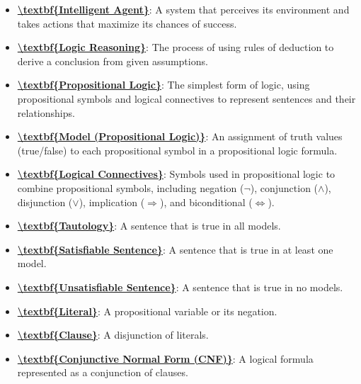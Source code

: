 \documentclass{article}%
\begin{document}
\begin{itemize}[leftmargin=*]%
\item \href{https://www.math.purdue.edu/~yipn/351/13L1-Logic.pdf#page=3}{\textbf{\textbackslash{}textbf\{Intelligent Agent\}}}: A system that perceives its environment and takes actions that maximize its chances of success.%
\item \href{https://www.math.purdue.edu/~yipn/351/13L1-Logic.pdf#page=7}{\textbf{\textbackslash{}textbf\{Logic Reasoning\}}}: The process of using rules of deduction to derive a conclusion from given assumptions.%
\item \href{https://www.math.purdue.edu/~yipn/351/13L1-Logic.pdf#page=8}{\textbf{\textbackslash{}textbf\{Propositional Logic\}}}: The simplest form of logic, using propositional symbols and logical connectives to represent sentences and their relationships.%
\item \href{https://www.math.purdue.edu/~yipn/351/13L1-Logic.pdf#page=9}{\textbf{\textbackslash{}textbf\{Model (Propositional Logic)\}}}: An assignment of truth values (true/false) to each propositional symbol in a propositional logic formula.%
\item \href{https://www.math.purdue.edu/~yipn/351/13L1-Logic.pdf#page=8}{\textbf{\textbackslash{}textbf\{Logical Connectives\}}}: Symbols used in propositional logic to combine propositional symbols, including negation ($\neg$), conjunction ($\wedge$), disjunction ($\vee$), implication ($\Rightarrow$), and biconditional ($\Leftrightarrow$).%
\item \href{https://www.math.purdue.edu/~yipn/351/13L1-Logic.pdf#page=13}{\textbf{\textbackslash{}textbf\{Tautology\}}}: A sentence that is true in all models.%
\item \href{https://www.math.purdue.edu/~yipn/351/13L1-Logic.pdf#page=13}{\textbf{\textbackslash{}textbf\{Satisfiable Sentence\}}}: A sentence that is true in at least one model.%
\item \href{https://www.math.purdue.edu/~yipn/351/13L1-Logic.pdf#page=13}{\textbf{\textbackslash{}textbf\{Unsatisfiable Sentence\}}}: A sentence that is true in no models.%
\item \href{https://www.math.purdue.edu/~yipn/351/13L1-Logic.pdf#page=16}{\textbf{\textbackslash{}textbf\{Literal\}}}: A propositional variable or its negation.%
\item \href{https://www.math.purdue.edu/~yipn/351/13L1-Logic.pdf#page=16}{\textbf{\textbackslash{}textbf\{Clause\}}}: A disjunction of literals.%
\item \href{https://www.math.purdue.edu/~yipn/351/13L1-Logic.pdf#page=16}{\textbf{\textbackslash{}textbf\{Conjunctive Normal Form (CNF)\}}}: A logical formula represented as a conjunction of clauses.%

\end{itemize}
\end{document}
